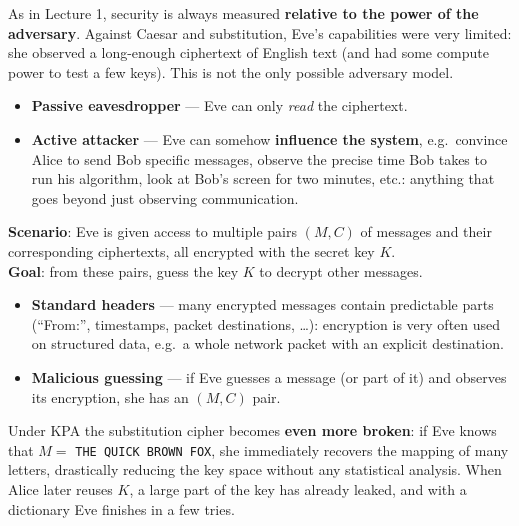 \begin{rembox}[title=Back to threat models]
As in Lecture 1, security is always measured \textbf{relative to the power of the
adversary}. Against Caesar and substitution, Eve's capabilities were very limited: she
observed a long-enough ciphertext of English text (and had some compute power to test a
few keys). This is not the only possible adversary model.
\end{rembox}

\begin{defnbox}[title=Types of adversaries]
\begin{itemize}
  \item \textbf{Passive eavesdropper} --- Eve can only \emph{read} the ciphertext.
  \item \textbf{Active attacker} --- Eve can somehow \textbf{influence the system},
        e.g.\ convince Alice to send Bob specific messages, observe the precise time
        Bob takes to run his algorithm, look at Bob's screen for two minutes, etc.: anything
        that goes beyond just observing communication.
\end{itemize}
\end{defnbox}

\begin{defnbox}[title=Known Plaintext Attack (KPA)]
\textbf{Scenario}: Eve is given access to multiple pairs $(M, C)$ of messages and their
corresponding ciphertexts, all encrypted with the secret key $K$. \\
\textbf{Goal}: from these pairs, guess the key $K$ to decrypt other messages.
\end{defnbox}

\begin{propbox}[title=Why is KPA a realistic model?]
\begin{itemize}
  \item \textbf{Standard headers} --- many encrypted messages contain predictable parts
        (``From:'', timestamps, packet destinations, \ldots): encryption is very often used on
        structured data, e.g.\ a whole network packet with an explicit destination.
  \item \textbf{Malicious guessing} --- if Eve guesses a message (or part of it) and
        observes its encryption, she has an $(M, C)$ pair.
\end{itemize}
\end{propbox}

\begin{exbox}[title=KPA and the substitution cipher]
Under KPA the substitution cipher becomes \textbf{even more broken}: if Eve knows that
$M = $ \texttt{THE QUICK BROWN FOX}, she immediately recovers the mapping of many
letters, drastically reducing the key space without any statistical analysis. When Alice later
reuses $K$, a large part of the key has already leaked, and with a dictionary Eve finishes in a
few tries.
\end{exbox}

